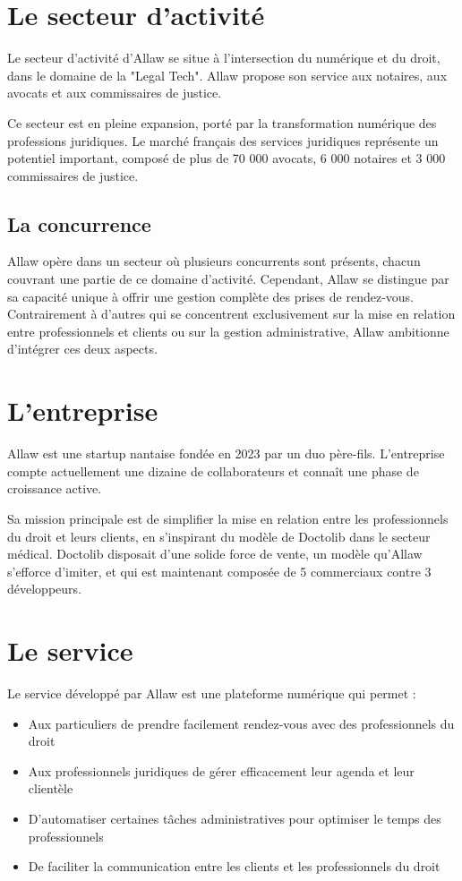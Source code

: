 \section{Le secteur d'activité}
Le secteur d'activité d'Allaw se situe à l'intersection du numérique et du
droit, dans le domaine de la "Legal Tech". Allaw propose son service aux
notaires, aux avocats et aux commissaires de justice.

Ce secteur est en pleine expansion, porté par la transformation numérique des
professions juridiques. Le marché français des services juridiques représente un
potentiel important, composé de plus de 70 000 avocats, 6 000 notaires et 3 000
commissaires de justice.

\subsection{La concurrence}
Allaw opère dans un secteur où plusieurs concurrents sont présents, chacun
couvrant une partie de ce domaine d'activité. Cependant, Allaw se distingue
par sa capacité unique à offrir une gestion complète des prises de rendez-vous.
Contrairement à d'autres qui se concentrent exclusivement sur la mise en
relation entre professionnels et clients ou sur la gestion administrative, Allaw
ambitionne d'intégrer ces deux aspects.

\section{L'entreprise}
Allaw est une startup nantaise fondée en 2023 par un duo père-fils. L'entreprise 
compte actuellement une dizaine de collaborateurs et connaît une phase de croissance 
active.

Sa mission principale est de simplifier la mise en relation entre les
professionnels du droit et leurs clients, en s'inspirant du modèle de Doctolib
dans le secteur médical. Doctolib disposait d'une solide force de vente,
un modèle qu'Allaw s'efforce d'imiter, et qui est maintenant composée de 5
commerciaux contre 3 développeurs.

\section{Le service}
Le service développé par Allaw est une plateforme numérique qui permet :
\begin{itemize}
    \item Aux particuliers de prendre facilement rendez-vous avec des professionnels du droit
    \item Aux professionnels juridiques de gérer efficacement leur agenda et leur clientèle
    \item D'automatiser certaines tâches administratives pour optimiser le temps des professionnels
    \item De faciliter la communication entre les clients et les professionnels du droit
\end{itemize}

